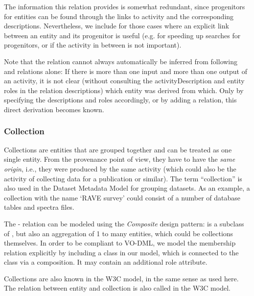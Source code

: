 The information this relation provides is somewhat redundant, since progenitors
for entities can be found through the links to activity and the corresponding
descriptions. Nevertheless, we include  for those cases
where an explicit  link between an entity and its progenitor is useful (e.g. for
speeding up searches for  progenitors, or if the activity in between is not
important).

Note that the  relation cannot always automatically be
inferred from following  and  relations alone:
If there is more than one input and more than one output of an activity, it is
not clear (without  consulting the activityDescription and entity roles in the
relation descriptions) which entity was derived from which. Only by specifying
the descriptions and roles accordingly, or by adding a 
relation, this direct derivation becomes known.



\subsubsection{Collection}\label{sec:collection}
Collections are entities that are grouped together and can be treated as one single entity. 
From the provenance point of view, they have to have the \emph{same origin}, i.e., they were 
produced by the same activity (which could also be the activity of collecting
data for a publication or similar). The term ``collection'' is 
also used in the Dataset Metadata Model for grouping datasets.
As an example, a collection 
with the name `RAVE survey' could consist of a number of database tables and spectra files.


The - relation can be modeled using the \emph{Composite} design pattern: 
 is a subclass of , but also an aggregation of 1 to many entities, 
which could be collections themselves. 
In order to be compliant to VO-DML, we model the membership relation explicitly 
by including a  class in our model, which is connected to the
 class via a composition. It may contain an additional role attribute.

Collections are also known in the W3C model, in the same sense as used here.
The relation between entity and collection is also called  in the W3C model.

